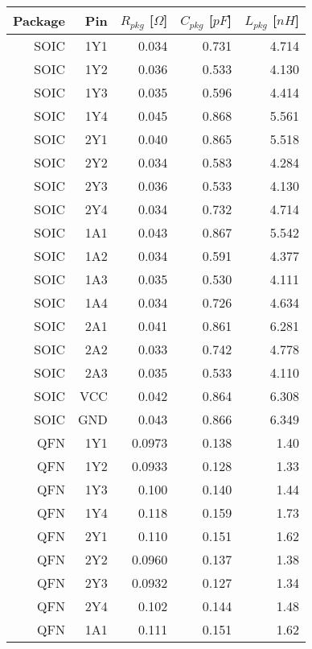 \documentclass[../main.tex]{subfiles}
\begin{document}
\begin{table}[h]
    \centering
    \begin{tabular}{r|r r r r}
        \toprule[1pt]
        \textbf{Package} & \textbf{Pin} & $R_{pkg}$ [$\si{\Omega}$] & $C_{pkg}$ [$\si{pF}$] & $L_{pkg}$ [$\si{nH}$] \\
        \midrule
        SOIC  & 1Y1  & 0.034 & 0.731 & 4.714 \\
        SOIC  & 1Y2  & 0.036 & 0.533 & 4.130 \\
        SOIC  & 1Y3  & 0.035 & 0.596 & 4.414 \\
        SOIC  & 1Y4  & 0.045 & 0.868 & 5.561 \\
        SOIC  & 2Y1  & 0.040 & 0.865 & 5.518 \\
        SOIC  & 2Y2  & 0.034 & 0.583 & 4.284 \\
        SOIC  & 2Y3  & 0.036 & 0.533 & 4.130 \\
        SOIC  & 2Y4  & 0.034 & 0.732 & 4.714 \\
        \midrule
        SOIC  & 1A1  & 0.043 & 0.867 & 5.542 \\
        SOIC  & 1A2  & 0.034 & 0.591 & 4.377 \\
        SOIC  & 1A3  & 0.035 & 0.530 & 4.111 \\
        SOIC  & 1A4  & 0.034 & 0.726 & 4.634 \\
        SOIC  & 2A1  & 0.041 & 0.861 & 6.281 \\
        SOIC  & 2A2  & 0.033 & 0.742 & 4.778 \\
        SOIC  & 2A3  & 0.035 & 0.533 & 4.110 \\
        SOIC  & VCC  & 0.042 & 0.864 & 6.308 \\
        SOIC  & GND  & 0.043 & 0.866 & 6.349 \\
        \midrule
        QFN  & 1Y1  & 0.0973 & 0.138 & 1.40 \\
        QFN  & 1Y2  & 0.0933 & 0.128 & 1.33 \\
        QFN  & 1Y3  & 0.100  & 0.140 & 1.44 \\
        QFN  & 1Y4  & 0.118  & 0.159 & 1.73 \\
        QFN  & 2Y1  & 0.110  & 0.151 & 1.62 \\
        QFN  & 2Y2  & 0.0960 & 0.137 & 1.38 \\
        QFN  & 2Y3  & 0.0932 & 0.127 & 1.34 \\
        QFN  & 2Y4  & 0.102  & 0.144 & 1.48 \\
        \midrule
        QFN  & 1A1  & 0.111  & 0.151 & 1.62 \\

\end{tabular}
\end{table}
\end{document}
